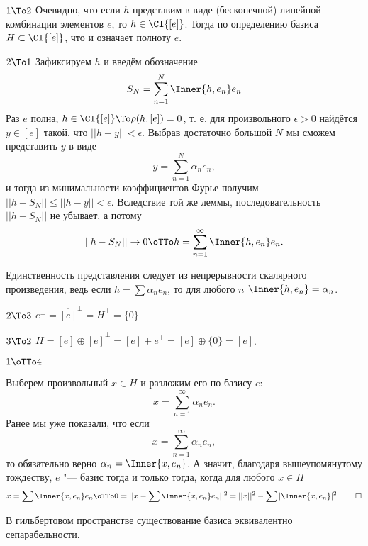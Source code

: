 \documentclass[main]{subfiles}
\begin{document}
\begin{itemproof}
\item[\( 1 \To 2 \)]
  Очевидно, что если \( h \) представим в виде
  (бесконечной) линейной комбинации элементов \( e \), то
  \( h \in \Cl{[e]} \). Тогда по определению базиса
  \( H \subset \Cl{[e]} \), что и означает полноту \( e \).
\item[\( 2 \To 1 \)]
  Зафиксируем \( h \) и введём обозначение
  \[
    S_N = \sum_{n = 1}^N \Inner{h, e_n} e_n
  \]
  Раз \( e \) полна, \( h \in \Cl{[e]} \To \rho(h, [e]) = 0 \),
  т. е. для произвольного \( \epsilon > 0 \) найдётся
  \( y \in [e] \) такой, что \( ||h - y|| < \epsilon \).
  Выбрав достаточно большой \( N \) мы сможем представить
  \( y \) в виде
  \[
    y = \sum_{n=1}^N \alpha_n e_n,
  \]
  и тогда из минимальности коэффициентов Фурье получим
  \( ||h - S_N|| \le ||h - y|| < \epsilon \).
  Вследствие той же леммы, последовательность
  \( ||h - S_N|| \)
  не убывает, а потому
  \[
    ||h - S_N|| \to 0 \oTTo h = \sum_{n = 1}^\infty \Inner{h, e_n} e_n.
  \]

  Единственность представления следует из непрерывности
  скалярного произведения, ведь если 
  \( h = \sum \alpha_n e_n \), то для любого \( n \)
  \( \Inner{h, e_n} = \alpha_n  \).
\item[\( 2 \To 3 \)] \( e^\perp = \overline{[e]}^\perp = H^\perp = \{ 0 \} \)
\item[\( 3 \To 2 \)] \( H = \overline{[e]} \oplus \overline{[e]}^\perp =
  \overline{[e]} + e^\perp = \overline{[e]} \oplus \{ 0 \} = \overline{[e]} \).

\item[\( 1 \oTTo 4 \)]

  Выберем произвольный \( x \in H \) и разложим его по базису \( e \):
  \[
    x = \sum_{n=1}^\infty \alpha_n e_n.
  \]
  Ранее мы уже показали, что если
  \[
    x = \sum_{n=1}^\infty \alpha_n e_n,
  \]
  то обязательно верно \( \alpha_n = \Inner{x, e_n} \).
  А значит, благодаря вышеупомянутому тождеству,
  \( e \) "--- базис тогда и только тогда, когда
  для любого \( x \in H \)
  \[
    x = \sum \Inner{x, e_n} e_n
    \oTTo 
    0 = ||x - \sum \Inner{x, e_n} e_n||^2 =
    ||x||^2 - \sum |\Inner{x, e_n}|^2. \qedhere
  \]
\end{itemproof}

\begin{theorem*}
  В гильбертовом пространстве
  существование базиса эквивалентно сепарабельности.
\end{theorem*}
\end{document}
